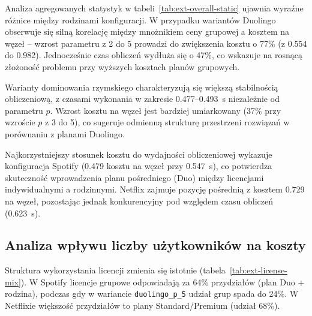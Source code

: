 Analiza agregowanych statystyk w tabeli~\ref{tab:ext-overall-static} ujawnia wyraźne różnice między rodzinami konfiguracji. W przypadku wariantów Duolingo obserwuje się silną korelację między mnożnikiem ceny grupowej a kosztem na węzeł -- wzrost parametru z 2 do 5 prowadzi do zwiększenia kosztu o 77\% (z 0.554 do 0.982). Jednocześnie czas obliczeń wydłuża się o 47\%, co wskazuje na rosnącą złożoność problemu przy wyższych kosztach planów grupowych.

Warianty dominowania rzymskiego charakteryzują się większą stabilnością obliczeniową, z czasami wykonania w zakresie 0.477--0.493~s niezależnie od parametru $p$. Wzrost kosztu na węzeł jest bardziej umiarkowany (37\% przy wzroście $p$ z 3 do 5), co sugeruje odmienną strukturę przestrzeni rozwiązań w porównaniu z planami Duolingo.

Najkorzystniejszy stosunek kosztu do wydajności obliczeniowej wykazuje konfiguracja Spotify (0.479 kosztu na węzeł przy 0.547~s), co potwierdza skuteczność wprowadzenia planu pośredniego (Duo) między licencjami indywidualnymi a rodzinnymi. Netflix zajmuje pozycję pośrednią z kosztem 0.729 na węzeł, pozostając jednak konkurencyjny pod względem czasu obliczeń (0.623~s).

\subsection{Analiza wpływu liczby użytkowników na koszty}

Struktura wykorzystania licencji zmienia się istotnie (tabela~\ref{tab:ext-license-mix}). W Spotify licencje grupowe odpowiadają za 64\% przydziałów (plan Duo + rodzina), podczas gdy w wariancie \texttt{duolingo\_p\_5} udział grup spada do 24\%. W Netflixie większość przydziałów to plany Standard/Premium (udział 68\%).

